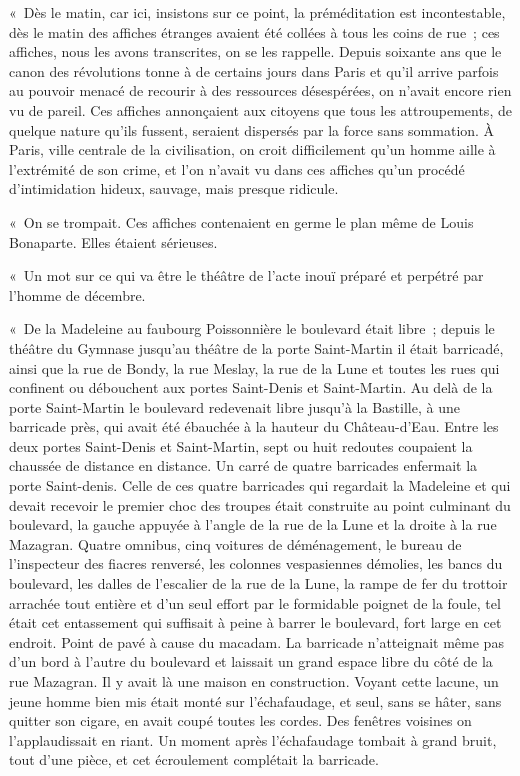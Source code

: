 \documentclass[french,twoside]{book} %
\begin{document}
\noindent « Dès le matin, car ici, insistons sur ce point, la préméditation est incontestable, dès le matin des affiches étranges avaient été collées à tous les coins de rue ; ces affiches, nous les avons transcrites, on se les rappelle. Depuis soixante ans que le canon des révolutions tonne à de certains jours dans Paris et qu’il arrive parfois au pouvoir menacé de recourir à des ressources désespérées, on n’avait encore rien vu de pareil. Ces affiches annonçaient aux citoyens que tous les attroupements, de quelque nature qu’ils fussent, seraient dispersés par la force sans sommation. À Paris, ville centrale de la civilisation, on croit difficilement qu’un homme aille à l’extrémité de son crime, et l’on n’avait vu dans ces affiches qu’un procédé d’intimidation hideux, sauvage, mais presque ridicule.\par
« On se trompait. Ces affiches contenaient en germe le plan même de Louis Bonaparte. Elles étaient sérieuses.\par
« Un mot sur ce qui va être le théâtre de l’acte inouï préparé et perpétré par l’homme de décembre.\par
« De la Madeleine au faubourg Poissonnière le boulevard était libre ; depuis le théâtre du Gymnase jusqu’au théâtre de la porte Saint-Martin il était barricadé, ainsi que la rue de Bondy, la rue Meslay, la rue de la Lune et toutes les rues qui confinent ou débouchent aux portes Saint-Denis et Saint-Martin. Au delà de la porte Saint-Martin le boulevard redevenait libre jusqu’à la Bastille, à une barricade près, qui avait été ébauchée à la hauteur du Château-d’Eau. Entre les deux portes Saint-Denis et Saint-Martin, sept ou huit redoutes coupaient la chaussée de distance en distance. Un carré de quatre barricades enfermait la porte Saint-denis. Celle de ces quatre barricades qui regardait la Madeleine et qui devait recevoir le premier choc des troupes était construite au point culminant du boulevard, la gauche appuyée à l’angle de la rue de la Lune et la droite à la rue Mazagran. Quatre omnibus, cinq voitures de déménagement, le bureau de l’inspecteur des fiacres renversé, les colonnes vespasiennes démolies, les bancs du boulevard, les dalles de l’escalier de la rue de la Lune, la rampe de fer du trottoir arrachée tout entière et d’un seul effort par le formidable poignet de la foule, tel était cet entassement qui suffisait à peine à barrer le boulevard, fort large en cet endroit. Point de pavé à cause du macadam. La barricade n’atteignait même pas d’un bord à l’autre du boulevard et laissait un grand espace libre du côté de la rue Mazagran. Il y avait là une maison en construction. Voyant cette lacune, un jeune homme bien mis était monté sur l’échafaudage, et seul, sans se hâter, sans quitter son cigare, en avait coupé toutes les cordes. Des fenêtres voisines on l’applaudissait en riant. Un moment après l’échafaudage tombait à grand bruit, tout d’une pièce, et cet écroulement complétait la barricade.\par
\end{document}
